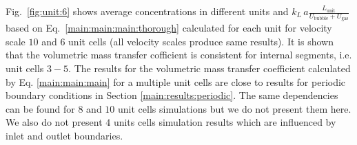 \documentclass{article}
\newcommand{\beq}{\begin{equation}}
\newcommand{\feq}{\end{equation}}
\newcommand{\beqal}{\begin{equation}\begin{aligned}}
\newcommand{\feqal}{\end{aligned}\end{equation}}
\newcommand{\vol}{k_L\,a}
\newcommand{\lunit}{L_{\mathrm{unit}}}
\newcommand{\ububble}{U_{\mathrm{bubble}}}
\newcommand{\uliq}{U_{\mathrm{liq}}}
\newcommand{\ugas}{U_{\mathrm{gas}}}
\newcommand{\cstar}{C^{*}}
\newcommand{\volnondim}{\vol \frac{\lunit}{\ububble+\ugas}}
\begin{document}
Fig.~\ref{fig:unit:6} shows average concentrations in different units and $\volnondim$ based on
Eq.~\ref{main:main:main:thorough} calculated for each unit for velocity
scale $10$ and  $6$ unit cells (all velocity scales produce same results). It is shown that the
volumetric mass transfer cofficient is consistent for internal segments, i.e.
unit cells $3-5$.  The results for the volumetric mass transfer
coefficient calculated by Eq. \ref{main:main:main} for a multiple unit cells are
close to results for periodic boundary conditions in Section
\ref{main:results:periodic}. 
The same dependencies
can be found for
$8$ and $10$ unit cells simulations but we do not present them here. We also do not present $4$
units cells simulation results which are influenced by inlet and outlet boundaries.
\end{document}
